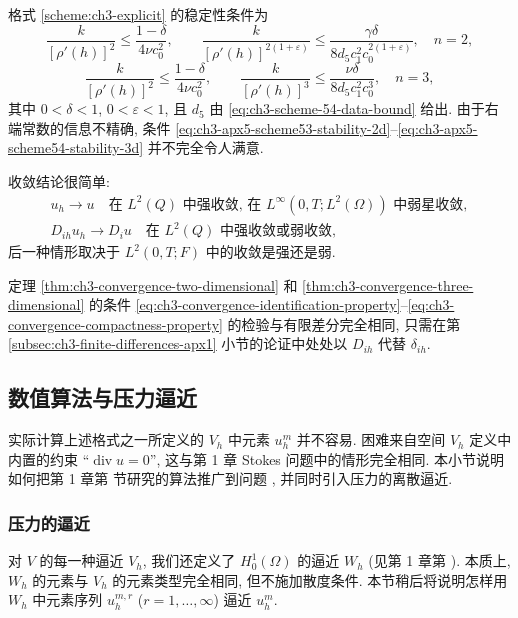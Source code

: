 格式 \ref{scheme:ch3-explicit} 的稳定性条件为
\begin{equation}
\frac{k}{[\rho'(h)]^2}\leq\frac{1-\delta}{4\nu c_0^2},
\qquad
\frac{k}{[\rho'(h)]^{2(1+\varepsilon)}}
\leq\frac{\gamma\delta}{8d_5c_1^2c_0^{2(1+\varepsilon)}},
\quad n=2,
\label{eq:ch3-apx5-scheme54-stability-2d}
\end{equation}
\begin{equation}
\frac{k}{[\rho'(h)]^2}\leq\frac{1-\delta}{4\nu c_0^2},
\qquad
\frac{k}{[\rho'(h)]^3}\leq\frac{\nu\delta}{8d_5c_1^2c_0^3},
\quad n=3,
\label{eq:ch3-apx5-scheme54-stability-3d}
\end{equation}
其中 $0<\delta<1$, $0<\varepsilon<1$, 且 $d_5$ 由 \eqref{eq:ch3-scheme-54-data-bound} 给出. 由于右端常数的信息不精确, 条件 \eqref{eq:ch3-apx5-scheme53-stability-2d}--\eqref{eq:ch3-apx5-scheme54-stability-3d} 并不完全令人满意.

收敛结论很简单:
\begin{equation}
\begin{gathered}
u_h\to u\quad\text{在 $L^2(Q)$ 中强收敛, 在 $L^\infty(0,T;L^2(\Omega))$ 中弱星收敛},\\
D_{ih}u_h\to D_i u\quad\text{在 $L^2(Q)$ 中强收敛或弱收敛},
\end{gathered}
\label{eq:ch3-apx5-convergence}
\end{equation}
后一种情形取决于 $L^2(0,T;F)$ 中的收敛是强还是弱.

\hypertarget{chapter-03-page-276}{}
定理 \ref{thm:ch3-convergence-two-dimensional} 和 \ref{thm:ch3-convergence-three-dimensional} 的条件 \eqref{eq:ch3-convergence-identification-property}--\eqref{eq:ch3-convergence-compactness-property} 的检验与有限差分完全相同, 只需在第 \ref{subsec:ch3-finite-differences-apx1} 小节的论证中处处以 $D_{ih}$ 代替 $\delta_{ih}$.

\subsection{数值算法与压力逼近}
\label{subsec:ch3-numerical-algorithms-pressure}

实际计算上述格式之一所定义的 $V_h$ 中元素 $u_h^m$ 并不容易. 困难来自空间 $V_h$ 定义中内置的约束 ``$\operatorname{div}u=0$'', 这与第 1 章 Stokes 问题中的情形完全相同. 本小节说明如何把第 1 章第  节研究的算法推广到问题 , 并同时引入压力的离散逼近.

\subsubsection{压力的逼近}
对 $V$ 的每一种逼近 $V_h$, 我们还定义了 $H_0^1(\Omega)$ 的逼近 $W_h$ (见第 1 章第 ). 本质上, $W_h$ 的元素与 $V_h$ 的元素类型完全相同, 但不施加散度条件. 本节稍后将说明怎样用 $W_h$ 中元素序列 $u_h^{m,r}$ ($r=1,\ldots,\infty$) 逼近 $u_h^m$.

